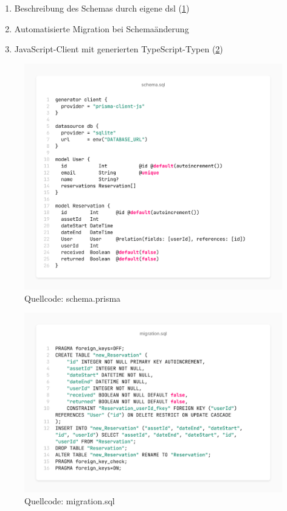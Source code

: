 \begin{enumerate}
  \item Beschreibung des Schemas durch eigene \ac{dsl} (\ref{fig:prisma})
  \item Automatisierte Migration bei Schemaänderung 
  \item JavaScript-Client mit generierten TypeScript-Typen (\ref{fig:mig})
\end{enumerate}

\begin{figure}[h]
  \centering
  \includegraphics[scale=0.35]{Bilder/screenshot(8).png}
  \caption[Quellcode: schema.prisma]{Quellcode: schema.prisma}
  \label{fig:prisma}
\end{figure}

\begin{figure}[h]
  \centering
  \includegraphics[scale=0.35]{Bilder/screenshot(7).png}
  \caption[Quellcode: migration.sql]{Quellcode: migration.sql}
  \label{fig:mig}
\end{figure}


